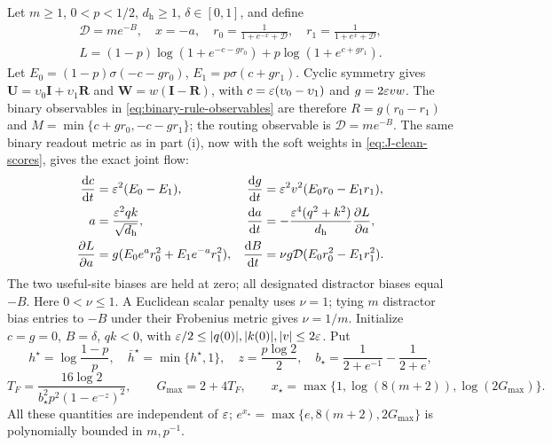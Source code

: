 Let $m\ge1$, $0<p<1/2$, $d_{\mathrm h}\ge1$, $\delta\in[0,1]$, and define
\[
 \begin{gathered}
 \mathcal D=me^{-B},\quad x=-a,\quad
 r_0=\frac1{1+e^{-x}+\mathcal D},\quad r_1=\frac1{1+e^x+\mathcal D},\\
 L=(1-p)\log(1+e^{-c-gr_0})+p\log(1+e^{c+gr_1}).
 \end{gathered}
\]
Let $E_0=(1-p)\sigma(-c-gr_0)$, $E_1=p\sigma(c+gr_1)$.
Cyclic symmetry gives $\mathbf U=\upsilon_0\mathbf I+\upsilon_1\mathbf R$ and $\mathbf W=w(\mathbf I-\mathbf R)$, with
$c=\varepsilon(\upsilon_0-\upsilon_1)$ and $g=2\varepsilon vw$. The binary observables in \cref{eq:binary-rule-observables} are therefore $R=g(r_0-r_1)$ and $M=\min\{c+gr_0,-c-gr_1\}$; the routing observable is $\mathcal D=me^{-B}$.
The same binary readout metric as in part (i), now with the soft weights in \cref{eq:J-clean-scores}, gives the exact joint flow:
\begin{align*}
 \ddt{c}&=\initscale^2(E_0-E_1),&
 \ddt{g}&=\initscale^2v^2(E_0r_0-E_1r_1),\\
 a&=\frac{\initscale^2qk}{\sqrt{d_{\mathrm h}}},&
 \ddt{a}&=-\frac{\initscale^4(q^2+k^2)}{d_{\mathrm h}}\pd{L}{a},\\
 \pd{L}{a}&=g(E_0e^a r_0^2+E_1e^{-a}r_1^2),&
 \ddt{B}&=\nu g\mathcal D(E_0r_0^2-E_1r_1^2).
\end{align*}
The two useful-site biases are held at zero; all designated distractor biases equal $-B$.
Here $0<\nu\le1$. A Euclidean scalar penalty uses $\nu=1$; tying $m$ distractor bias entries to $-B$ under their Frobenius metric gives $\nu=1/m$.
Initialize $c=g=0$, $B=\delta$, $qk<0$, with
$\varepsilon/2\le |q(0)|,|k(0)|,|v|\le2\varepsilon$.
Put
\begin{equation}
 h^\star=\log\frac{1-p}{p},\quad \bar h^\star=\min\{h^\star,1\},\quad
 z=\frac{p\log2}{2},\quad
 b_\star=\frac1{2+e^{-1}}-\frac1{2+e},
\end{equation}
\begin{equation}
 T_F=\frac{16\log2}{b_\star^2p^2(1-e^{-z})^2},\qquad
 G_{\max}=2+4T_F,\qquad x_\star=\max\{1,\log(8(m+2)),\log(2G_{\max})\}.
 \label{eq:CR-constants}
\end{equation}
All these quantities are independent of $\varepsilon$; $e^{x_\star}=\max\{e,8(m+2),2G_{\max}\}$ is polynomially bounded in $m,p^{-1}$.

